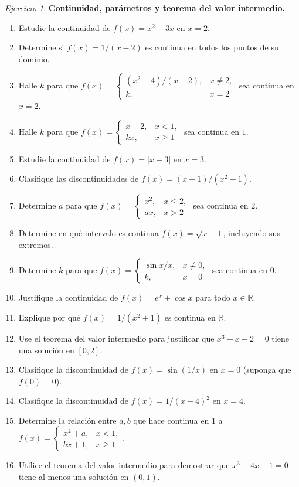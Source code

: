 \documentclass[12pt]{article}
\theoremstyle{remark}
\newtheorem{Ejer}{Ejercicio}
\newcommand{\R}{\mathbb{R}}
\begin{document}
\begin{Ejer}\textbf{Continuidad, parámetros y teorema del valor intermedio.}
\begin{enumerate}[resume=banco]
\item Estudie la continuidad de $f(x)=x^2-3x$ en $x=2$.
\item Determine si $f(x)=1/(x-2)$ es continua en todos los puntos de su dominio.
\item Halle $k$ para que $f(x)=\begin{cases}(x^2-4)/(x-2),&x\ne2,\\k,&x=2\end{cases}$ sea continua en $x=2$.
\item Halle $k$ para que $f(x)=\begin{cases}x+2,&x<1,\\kx,&x\ge1\end{cases}$ sea continua en $1$.
\item Estudie la continuidad de $f(x)=|x-3|$ en $x=3$.
\item Clasifique las discontinuidades de $f(x)=(x+1)/(x^2-1)$.
\item Determine $a$ para que $f(x)=\begin{cases}x^2,&x\le2,\\ax,&x>2\end{cases}$ sea continua en $2$.
\item Determine en qué intervalo es continua $f(x)=\sqrt{x-1}$, incluyendo sus extremos.
\item Determine $k$ para que $f(x)=\begin{cases}\sin x/x,&x\ne0,\\k,&x=0\end{cases}$ sea continua en $0$.
\item Justifique la continuidad de $f(x)=e^x+\cos x$ para todo $x\in\R$.
\item Explique por qué $f(x)=1/(x^2+1)$ es continua en $\R$.
\item Use el teorema del valor intermedio para justificar que $x^3+x-2=0$ tiene una solución en $[0,2]$.
\item Clasifique la discontinuidad de $f(x)=\sin(1/x)$ en $x=0$ (suponga que $f(0)=0$).
\item Clasifique la discontinuidad de $f(x)=1/(x-4)^2$ en $x=4$.
\item Determine la relación entre $a,b$ que hace continua en $1$ a $f(x)=\begin{cases}x^2+a,&x<1,\\bx+1,&x\ge1\end{cases}$.
\item Utilice el teorema del valor intermedio para demostrar que $x^3-4x+1=0$ tiene al menos una solución en $(0,1)$.
\end{enumerate}
\end{Ejer}
\end{document}
